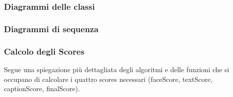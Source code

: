 \begin{comment}
    \item \verb+__parse_dominant_language_response(self, domResponse)+: ritorna il codice della lingua;
    dominante, oppure (per default), 'en', cioè inglese;
    
    \item \verb+__unpack_post_for_comprehend(self, sPost: ScoringPost)+: prepara il testo da dare in
    pasto a comprehend in modo che sia correttamente analizzato.

\end{itemize}
\end{comment}
\subsubsection{Diagrammi delle classi}
\subsubsection{Diagrammi di sequenza}
\subsubsection{Calcolo degli Scores}
Segue una spiegazione più dettagliata degli algoritmi e delle funzioni che si occupano di calcolare
i quattro scores necessari (faceScore, textScore, captionScore, finalScore).
